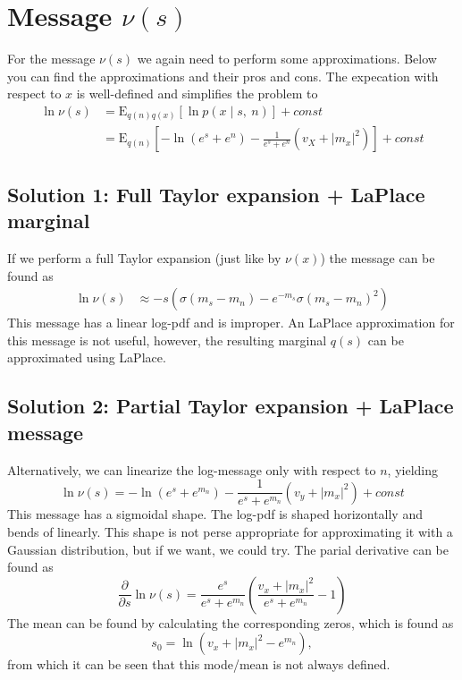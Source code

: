 \section{Message $\nu(s)$}
For the message $\nu(s)$ we again need to perform some approximations. Below you can find the approximations and their pros and cons. The expecation with respect to $x$ is well-defined and simplifies the problem to 
\begin{equation}
    \begin{split}
        \ln \nu(s) 
        &= \mathrm{E}_{q(n)q(x)} \left[\ln p(x\mid s,\ n)\right] + \textit{const} \\
        &= \mathrm{E}_{q(n)} \left[-\ln(e^s + e^n) - \frac{1}{e^s + e^n} (v_X + |m_x|^2)\right] + \textit{const}
    \end{split}
\end{equation}

\subsection{Solution 1: Full Taylor expansion + LaPlace marginal}
If we perform a full Taylor expansion (just like by $\nu(x)$) the message can be found as 
\begin{equation}
    \begin{split}
        \ln \nu(s) 
        &\approx -s\left(\sigma(m_s-m_n) - e^{-m_s} \sigma(m_s - m_n)^2\right)
    \end{split}
\end{equation}
This message has a linear log-pdf and is improper. An LaPlace approximation for this message is not useful, however, the resulting marginal $q(s)$ can be approximated using LaPlace.

\subsection{Solution 2: Partial Taylor expansion + LaPlace message}
Alternatively, we can linearize the log-message only with respect to $n$, yielding
\begin{equation}
    \ln \nu(s) = -\ln(e^s + e^{m_n}) - \frac{1}{e^s + e^{m_n}} (v_y + |m_x|^2) + \textit{const}
\end{equation}
This message has a sigmoidal shape. The log-pdf is shaped horizontally and bends of linearly. This shape is not perse appropriate for approximating it with a Gaussian distribution, but if we want, we could try.
The parial derivative can be found as 
\begin{equation}
    \frac{\partial}{\partial s} \ln \nu(s) = \frac{e^s}{e^s + e^{m_n}} \left(\frac{v_x + |m_x|^2}{e^s + e^{m_n}} - 1\right)
\end{equation}
The mean can be found by calculating the corresponding zeros, which is found as 
\begin{equation}
    s_0 = \ln(v_x + |m_x|^2 - e^{m_n}),
\end{equation}
from which it can be seen that this mode/mean is not always defined.


